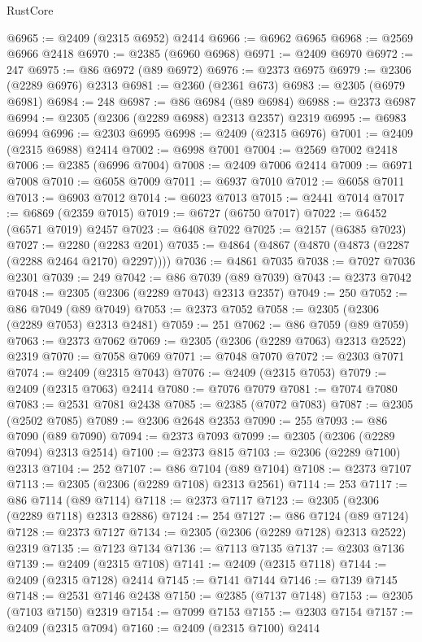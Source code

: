 \begin{lexlean}{RustCore}
\begin{coremodule}
@6965 := @2409 (@2315 @6952) @2414
@6966 := @6962 @6965
@6968 := @2569 @6966 @2418
@6970 := @2385 (@6960 @6968)
@6971 := @2409 @6970
@6972 := 247
@6975 := @86 @6972 (@89 @6972)
@6976 := @2373 @6975
@6979 := @2306 (@2289 @6976) @2313
@6981 := @2360 (@2361 @673)
@6983 := @2305 (@6979 @6981)
@6984 := 248
@6987 := @86 @6984 (@89 @6984)
@6988 := @2373 @6987
@6994 := @2305 (@2306 (@2289 @6988) @2313 @2357) @2319
@6995 := @6983 @6994
@6996 := @2303 @6995
@6998 := @2409 (@2315 @6976)
@7001 := @2409 (@2315 @6988) @2414
@7002 := @6998 @7001
@7004 := @2569 @7002 @2418
@7006 := @2385 (@6996 @7004)
@7008 := @2409 @7006 @2414
@7009 := @6971 @7008
@7010 := @6058 @7009
@7011 := @6937 @7010
@7012 := @6058 @7011
@7013 := @6903 @7012
@7014 := @6023 @7013
@7015 := @2441 @7014
@7017 := @6869 (@2359 @7015)
@7019 := @6727 (@6750 @7017)
@7022 := @6452 (@6571 @7019) @2457
@7023 := @6408 @7022
@7025 := @2157 (@6385 @7023)
@7027 := @2280 (@2283 @201)
@7035 := @4864 (@4867 (@4870 (@4873 (@2287 (@2288 @2464 @2170) @2297))))
@7036 := @4861 @7035
@7038 := @7027 @7036 @2301
@7039 := 249
@7042 := @86 @7039 (@89 @7039)
@7043 := @2373 @7042
@7048 := @2305 (@2306 (@2289 @7043) @2313 @2357)
@7049 := 250
@7052 := @86 @7049 (@89 @7049)
@7053 := @2373 @7052
@7058 := @2305 (@2306 (@2289 @7053) @2313 @2481)
@7059 := 251
@7062 := @86 @7059 (@89 @7059)
@7063 := @2373 @7062
@7069 := @2305 (@2306 (@2289 @7063) @2313 @2522) @2319
@7070 := @7058 @7069
@7071 := @7048 @7070
@7072 := @2303 @7071
@7074 := @2409 (@2315 @7043)
@7076 := @2409 (@2315 @7053)
@7079 := @2409 (@2315 @7063) @2414
@7080 := @7076 @7079
@7081 := @7074 @7080
@7083 := @2531 @7081 @2438
@7085 := @2385 (@7072 @7083)
@7087 := @2305 (@2502 @7085)
@7089 := @2306 @2648 @2353
@7090 := 255
@7093 := @86 @7090 (@89 @7090)
@7094 := @2373 @7093
@7099 := @2305 (@2306 (@2289 @7094) @2313 @2514)
@7100 := @2373 @815
@7103 := @2306 (@2289 @7100) @2313
@7104 := 252
@7107 := @86 @7104 (@89 @7104)
@7108 := @2373 @7107
@7113 := @2305 (@2306 (@2289 @7108) @2313 @2561)
@7114 := 253
@7117 := @86 @7114 (@89 @7114)
@7118 := @2373 @7117
@7123 := @2305 (@2306 (@2289 @7118) @2313 @2886)
@7124 := 254
@7127 := @86 @7124 (@89 @7124)
@7128 := @2373 @7127
@7134 := @2305 (@2306 (@2289 @7128) @2313 @2522) @2319
@7135 := @7123 @7134
@7136 := @7113 @7135
@7137 := @2303 @7136
@7139 := @2409 (@2315 @7108)
@7141 := @2409 (@2315 @7118)
@7144 := @2409 (@2315 @7128) @2414
@7145 := @7141 @7144
@7146 := @7139 @7145
@7148 := @2531 @7146 @2438
@7150 := @2385 (@7137 @7148)
@7153 := @2305 (@7103 @7150) @2319
@7154 := @7099 @7153
@7155 := @2303 @7154
@7157 := @2409 (@2315 @7094)
@7160 := @2409 (@2315 @7100) @2414

\end{coremodule}
\end{lexlean}
